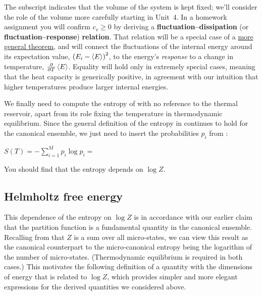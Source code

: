 The subscript indicates that the volume of the system is kept fixed; we'll consider the role of the volume more carefully starting in Unit~4.
In a homework assignment you will confirm $c_v \geq 0$ by deriving a \textbf{fluctuation--dissipation} (or \textbf{fluctuation--response}) \textbf{relation}.
That relation will be a special case of a \href{https://en.wikipedia.org/wiki/Fluctuation-dissipation_theorem}{more general theorem}, and will connect the fluctuations of the internal energy around its expectation value, $\left(E_i - \left\langle E \right\rangle\right)^2$, to the energy's \textit{response} to a change in temperature, $\frac{\partial }{\partial T} \left\langle E \right\rangle$.
Equality will hold only in extremely special cases, meaning that the heat capacity is generically positive, in agreement with our intuition that higher temperatures produce larger internal energies.

\newpage %
We finally need to compute the entropy of \Om with no reference to the thermal reservoir, apart from its role fixing the temperature in thermodynamic equilibrium.
Since the general definition of the entropy in  continues to hold for the canonical ensemble, we just need to insert the probabilities $p_i$ from :
\begin{mdframed}
  $\displaystyle S(T) = -\sum_{i = 1}^M p_i \log p_i = $ \\[100 pt]
\end{mdframed}
You should find that the entropy depends on $\log Z$.



\subsection{\label{sec:Helmholtz}Helmholtz free energy}
This dependence of the entropy on $\log Z$ is in accordance with our earlier claim that the partition function is a fundamental quantity in the canonical ensemble.
Recalling from  that $Z$ is a sum over all micro-states, we can view this result as the canonical counterpart to the micro-canonical entropy being the logarithm of the number of micro-states.
(Thermodynamic equilibrium is required in both cases.)
This motivates the following definition of a quantity with the dimensions of energy that is related to $\log Z$, which provides simpler and more elegant expressions for the derived quantities we considered above.


